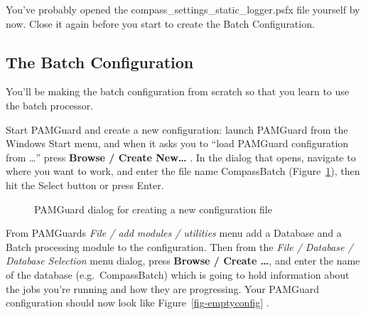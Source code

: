 \documentclass[
]{article}
\begin{document}
You've probably opened the compass\_settings\_static\_logger.psfx file
yourself by now. Close it again before you start to create the Batch
Configuration.

\subsection{The Batch Configuration}\label{the-batch-configuration}

You'll be making the batch configuration from scratch so that you learn
to use the batch processor.

Start PAMGuard and create a new configuration: launch PAMGuard from the
Windows Start menu, and when it asks you to ``load PAMGuard
configuration from \ldots{}'' press \textbf{Browse / Create New\ldots{}}
. In the dialog that opens, navigate to where you want to work, and
enter the file name CompassBatch (Figure~\ref{fig-createpsfx}), then hit
the Select button or press Enter.

\begin{figure}


\caption{\label{fig-createpsfx}PAMGuard dialog for creating a new
configuration file}

\end{figure}%

From PAMGuards \emph{File / add modules / utilities} menu add a Database
and a Batch processing module to the configuration. Then from the
\emph{File / Database / Database Selection} menu dialog, press
\textbf{Browse / Create \ldots{}}, and enter the name of the database
(e.g.~CompassBatch) which is going to hold information about the jobs
you're running and how they are progressing. Your PAMGuard configuration
should now look like Figure~\ref{fig-emptyconfig} .
\end{document}
